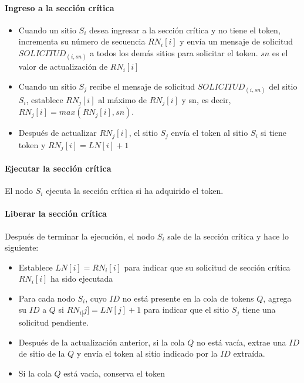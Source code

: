 {	\paragraph{Ingreso a la secci\'on cr\'itica}
	
	\begin{itemize}
		\item  	Cuando un sitio $S_{i}$ desea ingresar a la sección 	crítica y no tiene el token, incrementa su número de secuencia $RN_{i}[i]$ y envía un mensaje de solicitud $SOLICITUD_{(i, sn)}$ a todos los demás sitios para solicitar el token.
 		$sn$ es el valor de actualización de $RN_{i}[i]$
		\item Cuando un sitio $S_{j}$ recibe el mensaje de solicitud  $SOLICITUD_{(i, sn)}$ del sitio $S_{i}$, establece $RN_{j}[i]$ al máximo de $RN_{j}[i]$ y sn, es decir, $RN_{j}[i] = max(RN_{j}[i], sn)$.
		\item Después de actualizar $RN_{j}[i]$, el sitio $S_{j}$ envía el token al sitio $S_{i}$ si tiene token y $RN_{j}[i] = LN[i] + 1$
	\end{itemize}
	
	\paragraph{Ejecutar la sección crítica}
		
	El nodo $S_{i}$ ejecuta la sección crítica si ha adquirido el token.
	
\paragraph{	Liberar la sección crítica}
	Después de terminar la ejecución, el nodo $S_{i}$ sale de la sección crítica y hace lo siguiente:
	
	\begin{itemize}
		\item Establece $LN[i] = RN_{i}[i]$ para indicar que su solicitud de sección crítica $RN_{i}[i]$ ha sido ejecutada
		\item Para cada nodo $S_{i}$, cuyo $ID$ no está presente en la cola de tokens $Q$, agrega su $ID$ a $Q$ si $RN_{i[}j] = LN[j] + 1$ para indicar que el sitio $S_{j}$ tiene una solicitud pendiente.
		\item Después de la actualización anterior, si la cola $Q$ no está vacía, extrae una $ID$ de sitio de la $Q$ y envía el token al sitio indicado por la $ID$ extraída.
		\item Si la cola $Q$ está vacía, conserva el token
\end{itemize}

}
